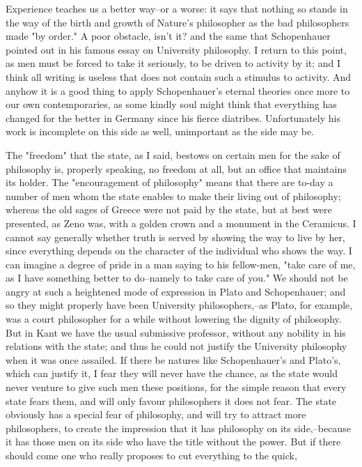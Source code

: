 Experience teaches us a better way--or a worse: it says that nothing
so stands in the way of the birth and growth of Nature's philosopher
as the bad philosophers made "by order." A poor obstacle, isn't it?
and the same that Schopenhauer pointed out in his famous essay on
University philosophy. I return to this point, as men must be forced
to take it seriously, to be driven to activity by it; and I think all
writing is useless that does not contain such a stimulus to activity.
And anyhow it is a good thing to apply Schopenhauer's eternal
theories once more to our own contemporaries, as some kindly soul
might think that everything has changed for the better in Germany
since his fierce diatribes. Unfortunately his work is incomplete on
this side as well, unimportant as the side may be.

The "freedom" that the state, as I said, bestows on certain men for
the sake of philosophy is, properly speaking, no freedom at all, but
an office that maintains its holder. The "encouragement of
philosophy" means that there are to-day a number of men whom the
state enables to make their living out of philosophy; whereas the old
sages of Greece were not paid by the state, but at best were
presented, as Zeno was, with a golden crown and a monument in the
Ceramicus. I cannot say generally whether truth is served by showing
the way to live by her, since everything depends on the character of
the individual who shows the way. I can imagine a degree of pride in
a man saying to his fellow-men, "take care of me, as I have something
better to do--namely to take care of you." We should not be angry at
such a heightened mode of expression in Plato and Schopenhauer; and
so they might properly have been University philosophers,--as Plato,
for example, was a court philosopher for a while without lowering the
dignity of philosophy. But in Kant we have the usual submissive
professor, without any nobility in his relations with the state; and
thus he could not justify the University philosophy when it was once
assailed. If there be natures like Schopenhauer's and Plato's, which
can justify it, I fear they will never have the chance, as the state
would never venture to give such men these positions, for the simple
reason that every state fears them, and will only favour philosophers
it does not fear. The state obviously has a special fear of
philosophy, and will try to attract more philosophers, to create the
impression that it has philosophy on its side,--because it has those
men on its side who have the title without the power. But if there
should come one who really proposes to cut everything to the quick,
